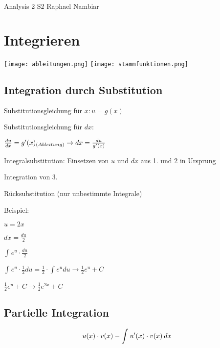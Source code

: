 



\begin{multicols*}{3}

\DocumentInfo
{Analysis 2 S2} %
{Raphael Nambiar} %

\WhiteSpace

\section{Integrieren}

\texttt{[image: ableitungen.png]} 
\texttt{[image: stammfunktionen.png]} 

\subsection{Integration durch Substitution}
{ Substitutionsgleichung für $x: u = g(x)$}

{ Substitutionsgleichung für $dx:$}

$ \frac{du}{dx} = g'(x)_{\tiny(Ableitung)} \to dx = \frac{du}{g'(x)}$

{ Integralsubstitution: Einsetzen von $ u $ und $ dx $ aus 1. und 2 in Ursprung}

{ Integration von 3.}

{ Rücksubstitution (nur unbestimmte Integrale)}


\begin{multicols}{2}
{Beispiel:}

 
\columnbreak

{ $ u = 2x $}
  
{ $ dx = \frac{du}{2} $}  

{ $ \int_{}{}e^u \cdot  \frac{du}{2} $}

\end{multicols}
\vspace{-10pt}
 { $ \int_{}{}e^u \cdot  \frac{1}{2}du = \frac{1}{2} \cdot  \int_{}{}e^u du \rightarrow \frac{1}{2} e^u + C   $}


{ $\frac{1}{2} e^u + C \rightarrow \frac{1}{2} e^{2x} + C$ }



\subsection{Partielle Integration}
{\large $$u(x)\cdot v(x) - \int_{}^{}u'(x) \cdot v(x) \hspace{2px}  dx$$}


\end{multicols*}
